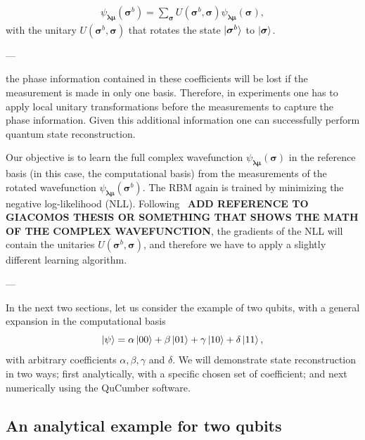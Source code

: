 \documentclass[submission, Phys]{SciPost}
\begin{document}
\begin{align}
	\psi_{\bm{\lambda} \bm{\mu}} (\bm{\sigma}^b)= \sum_{\bm{\sigma}} U (\bm{\sigma}^b, \bm{\sigma}) \psi_{\bm{\lambda} \bm{\mu}} (\bm{\sigma}),
\end{align}
%
with the unitary $U (\bm{\sigma}^b, \bm{\sigma})$ that rotates the state $\ket{\bm{\sigma}^b}$ to $\ket{\bm{\sigma}}$.

---

the phase information contained in these coefficients will be lost if the measurement
is made in only one basis. 
Therefore, in experiments one has to apply local unitary transformations before the measurements
to capture the phase information. Given this additional information one can successfully perform quantum state reconstruction.


Our objective is to learn the full complex wavefunction $\psi_{\bm{\lambda} \bm{\mu}} (\bm{\sigma})$ in the reference basis (in this case, the computational basis) from the measurements of the rotated wavefunction $\psi_{\bm{\lambda} \bm{\mu}} (\bm{\sigma}^b)$.
The RBM again is trained by minimizing the negative log-likelihood (NLL). Following~\cite{} \textbf{ADD REFERENCE TO GIACOMOS THESIS OR SOMETHING THAT SHOWS THE MATH OF THE COMPLEX WAVEFUNCTION}, the gradients of the NLL will contain the unitaries $U (\bm{\sigma}^b, \bm{\sigma})$, and therefore we have to apply a slightly different learning algorithm.

---

In the next two sections, let us consider the example of two qubits, with a general expansion in the computational basis
\begin{equation}
\ket{\psi} = \alpha  \ket{00} + \beta  \ket{01} + \gamma  \ket{10} + \delta \ket{11},
\end{equation}
with arbitrary coefficients $\alpha, \beta, \gamma$ and $\delta$.  We will demonstrate state reconstruction in two ways; first analytically, with a specific chosen set of coefficient; and next numerically using the QuCumber software.

\subsection{An analytical example for two qubits}
\end{document}
